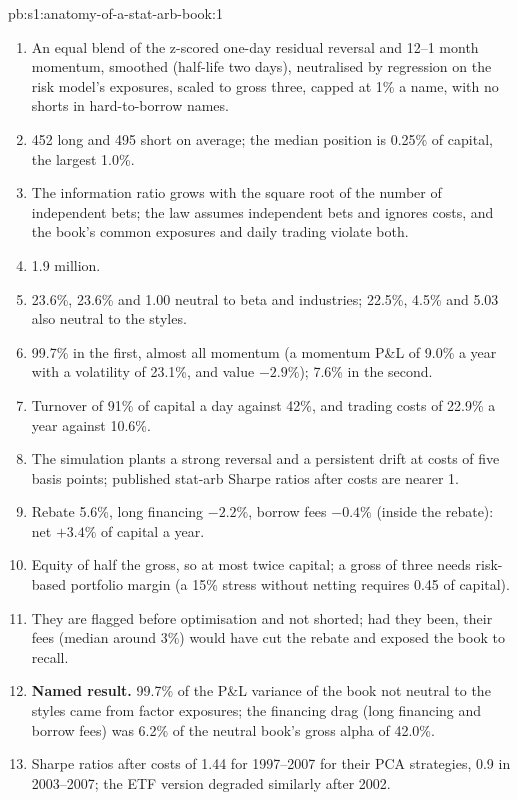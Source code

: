 \begin{solution}{pb:s1:anatomy-of-a-stat-arb-book:1}
\begin{enumerate}
\item An equal blend of the z-scored one-day residual reversal and 12--1 month momentum, smoothed (half-life two days), neutralised by regression on the risk
model's exposures, scaled to gross three, capped at 1\% a name, with no shorts in hard-to-borrow names.
\item 452 long and 495 short on average; the median position is 0.25\% of capital, the largest 1.0\%.
\item The information ratio grows with the square root of the number of independent bets; the law assumes independent bets and ignores costs, and the book's
common exposures and daily trading violate both.
\item 1.9 million.
\item 23.6\%, 23.6\% and 1.00 neutral to beta and industries; 22.5\%, 4.5\% and 5.03 also neutral to the styles.
\item 99.7\% in the first, almost all momentum (a momentum P\&L of 9.0\% a year with a volatility of 23.1\%, and value $-2.9\%$); 7.6\% in the second.
\item Turnover of 91\% of capital a day against 42\%, and trading costs of 22.9\% a year against 10.6\%.
\item The simulation plants a strong reversal and a persistent drift at costs of five basis points; published stat-arb Sharpe ratios after costs are nearer 1.
\item Rebate 5.6\%, long financing $-2.2\%$, borrow fees $-0.4\%$ (inside the rebate): net $+3.4\%$ of capital a year.
\item Equity of half the gross, so at most twice capital; a gross of three needs risk-based portfolio margin (a 15\% stress without netting requires 0.45 of
capital).
\item They are flagged before optimisation and not shorted; had they been, their fees (median around 3\%) would have cut the rebate and exposed the book to recall.
\item \textbf{Named result.} 99.7\% of the P\&L variance of the book not neutral to the styles came from factor exposures; the financing drag (long financing and
borrow fees) was 6.2\% of the neutral book's gross alpha of 42.0\%.
\item Sharpe ratios after costs of 1.44 for 1997--2007 for their PCA strategies, 0.9 in 2003--2007; the ETF version degraded similarly after 2002.

\end{enumerate}
\end{solution}
